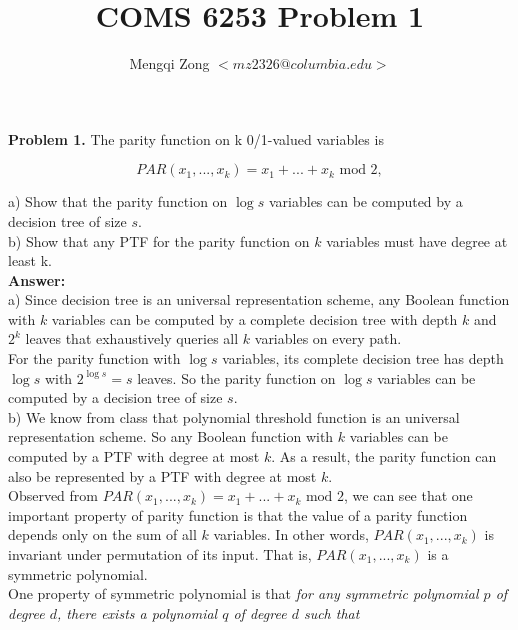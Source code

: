 \documentclass[12pt]{article}
\title{COMS 6253 Problem 1}
\author{Mengqi Zong $<mz2326@columbia.edu>$}
\begin{document}
\maketitle

\setlength{\parindent}{0in}

{\bf Problem 1.} The parity function on k 0/1-valued variables is

\begin{equation*}
PAR(x_1,...,x_k) = x_1 + ... + x_k \text { mod } 2,
\end{equation*}

a)  Show that the parity function on $\log s$ variables can be
computed by a decision tree of size $s$. \\

b)  Show that any PTF for the parity function on $k$ variables must
have degree at least k. \\

{\bf Answer:} \\

a) Since decision tree is an universal representation scheme, any
Boolean function with $k$ variables can be computed by a complete
decision tree with depth $k$ and $2^k$ leaves that exhaustively
queries all $k$ variables on every path. \\

For the parity function with $\log s$ variables, its complete decision
tree has depth $\log s$ with $2^{\log s} = s$ leaves. So the parity
function on $\log s$ variables can be computed by a decision tree of
size $s$. \\

b) We know from class that polynomial threshold function is an
universal representation scheme. So any Boolean function with $k$
variables can be computed by a PTF with degree at most $k$. As a
result, the parity function can also be represented by a PTF with
degree at most $k$. \\

Observed from $PAR(x_1,...,x_k) = x_1 + ... + x_k \text { mod } 2$,
we can see that one important property of parity function is that the
value of a parity function depends only on the sum of all $k$
variables. In other words, $PAR(x_1,  ..., x_k)$ is invariant under
permutation of its input. That is, $PAR(x_1,  ..., x_k)$ is a
symmetric polynomial. \\

One property of symmetric polynomial is that \emph {for any symmetric
  polynomial $p$ of degree $d$, there exists a polynomial $q$ of
  degree $d$ such that}
\end{document}
